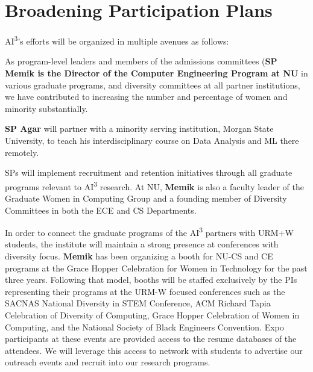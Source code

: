 \section{Broadening Participation Plans}\label{sec.broadpar}
AI\textsuperscript{3}'s efforts will be organized in multiple avenues as follows:



 As program-level leaders and members of the admissions committees (\textbf{SP Memik is the Director of the Computer Engineering Program at NU} in various graduate programs, and diversity committees at all partner institutions, we have contributed to increasing the number and percentage of women and minority substantially. 

\textbf{SP Agar} will partner with a minority serving institution, Morgan State University, to teach his interdisciplinary course on Data Analysis and ML there remotely. 


SPs will implement recruitment and retention initiatives through all graduate programs relevant to AI\textsuperscript{3} research. At NU, \textbf{Memik} is also a faculty leader of the Graduate Women in Computing Group and a founding member of Diversity Committees in both the ECE and CS Departments. 

In order to connect the graduate programs of the AI\textsuperscript{3} partners with URM+W students, the institute will maintain a strong presence at conferences with diversity focus. \textbf{Memik} has been organizing a booth for NU-CS and CE programs at the Grace Hopper Celebration for Women in Technology for the past three years. Following that model, booths will be staffed exclusively by the PIs representing their programs at the URM-W focused conferences such as the SACNAS National Diversity in STEM Conference, ACM Richard Tapia Celebration of Diversity of Computing, Grace
Hopper Celebration of Women in Computing, and the National Society of Black Engineers Convention. Expo participants at these events are provided access to the resume databases of the attendees. We will leverage this access to network with students to advertise our outreach events and recruit into our research programs. 

